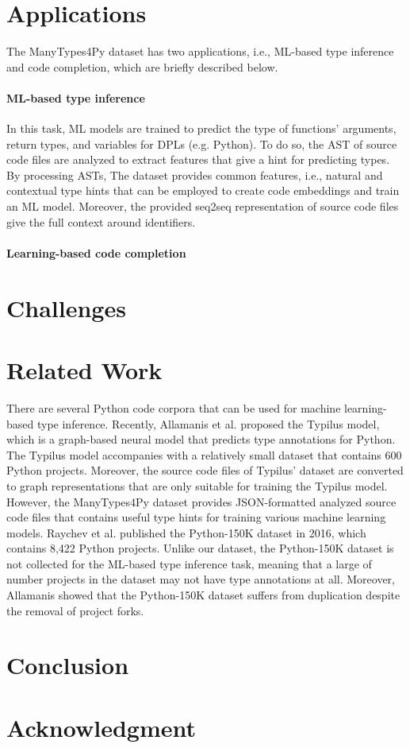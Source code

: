 \documentclass[10pt, conference]{IEEEtran}
\begin{document}
\section{Applications}
The ManyTypes4Py dataset has two applications, i.e., ML-based type inference and code completion, which are briefly described below.
\paragraph{\textbf{ML-based type inference}} In this task, ML models are trained to predict the type of functions' arguments, return types, and variables for DPLs (e.g. Python). To do so, the AST of source code files are analyzed to extract features that give a hint for predicting types. By processing ASTs, The dataset provides common features, i.e., natural and contextual type hints that can be employed to create code embeddings and train an ML model. Moreover, the provided seq2seq representation of source code files give the full context around identifiers.

\paragraph{\textbf{Learning-based code completion}}

\section{Challenges}

\section{Related Work}
There are several Python code corpora that can be used for machine learning-based type inference. Recently, Allamanis et al. \cite{allamanis2020typilus} proposed the Typilus model, which is a graph-based neural model that predicts type annotations for Python. The Typilus model \cite{allamanis2020typilus} accompanies with a relatively small dataset that contains 600 Python projects. Moreover, the source code files of Typilus' dataset are converted to graph representations that are only suitable for training the Typilus model. However, the ManyTypes4Py dataset provides JSON-formatted analyzed source code files that contains useful type hints for training various machine learning models. Raychev et al. \cite{raychev2016probabilistic} published the Python-150K dataset in 2016, which contains 8,422 Python projects. Unlike our dataset, the Python-150K dataset \cite{raychev2016probabilistic} is not collected for the ML-based type inference task, meaning that a large of number projects in the dataset may not have type annotations at all. Moreover, Allamanis \cite{allamanis2019adverse} showed that the Python-150K dataset suffers from duplication despite the removal of project forks.


\section{Conclusion}

\section*{Acknowledgment}



\end{document}
